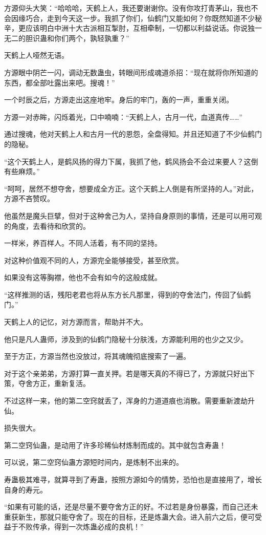 \begin{this_body}
方源仰头大笑：“哈哈哈，天鹤上人，我还要谢谢你。没有你攻打青茅山，我也不会因缘巧合，走到今天这一步。我抓了你们，仙鹤门又能如何？你既然知道不少秘辛，更应该明白中洲十大古派相互掣肘，互相牵制，一切都以利益说话。你说独一无二的胆识蛊和你们两个，孰轻孰重？”

天鹤上人哑然无语。

方源眼中阴芒一闪，调动无数蛊虫，转眼间形成魂道杀招：“现在就将你所知道的东西，都全部吐露出来吧。搜魂！”

一个时辰之后，方源走出这座地牢。身后的牢门，轰的一声，重重关闭。

方源一对赤眸，闪烁着光，口中喃喃：“天鹤上人，古月一代，血道真传……”

通过搜魂，他对天鹤上人和古月一代的恩怨，全盘得知。并且还知道了不少仙鹤门的隐秘。

“这个天鹤上人，是鹤风扬的得力下属，我抓了他，鹤风扬会不会过来要人？这倒有些麻烦。”

“呵呵，居然不想夺舍，想要成全方正。这个天鹤上人倒是有所坚持的人。”对此，方源不吝赞叹。

他虽然是魔头巨擘，但对于这种舍己为人，坚持自身原则的事情，还是可以用可观的角度，去看待和欣赏的。

一样米，养百样人。不同人活着，有不同的坚持。

对这种价值观不同的人，方源完全能够接受，甚至欣赏。

如果没有这等胸襟，他也不会有如今的这般成就。

“这样推测的话，残阳老君也将从东方长凡那里，得到的夺舍法门，传回了仙鹤门。”

天鹤上人的记忆，对方源而言，帮助并不大。

他只是凡人蛊师，涉及到的仙鹤门隐秘十分肤浅，方源能利用的也少之又少。

至于方正，方源当然也没放过，将其魂魄彻底搜索了一遍。

对于这个亲弟弟，方源打算一直关押。若是哪天真的不得已了，方源就只好出下策，夺舍方正，重新复活。

不过这样一来，他的第二空窍就丢了，浑身的力道道痕也消散。需要重新渡劫升仙。

损失很大。

第二空窍仙蛊，是动用了许多珍稀仙材炼制而成的。其中就包含寿蛊！

可以说，第二空窍仙蛊方源短时间内，是炼制不出来的。

寿蛊极其难寻，就算寻到了寿蛊，按照方源如今的情势，恐怕也是直接用了，增长自身的寿元。

“如果有可能的话，还是尽量不要夺舍方正的好。不过若是身份暴露，而自己还未重获新生，那就只能夺舍了。现在的目标，还是炼蛊大会。进入前六之后，便可受益于不败传承，得到一次炼蛊必成的良机！”


\end{this_body}
